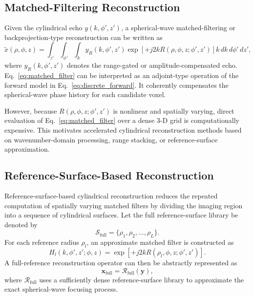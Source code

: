\documentclass[journal]{IEEEtran}
\begin{document}
\subsection{Matched-Filtering Reconstruction}
\label{subsec:matched_filter}

Given the cylindrical echo \(y(k,\phi',z')\), a spherical-wave matched-filtering or backprojection-type reconstruction can be written as
\begin{equation}
 \tilde{x}(\rho,\phi,z)=
 \int_{z'}\int_{\phi'}\int_{k}
 y_R(k,\phi',z')
 \exp[+j2kR(\rho,\phi,z;\phi',z')]
 k\, dk\, d\phi'\, dz',
\label{eq:matched_filter}
\end{equation}
where \(y_R(k,\phi',z')\) denotes the range-gated or amplitude-compensated echo. Eq.~\eqref{eq:matched_filter} can be interpreted as an adjoint-type operation of the forward model in Eq.~\eqref{eq:discrete_forward}. It coherently compensates the spherical-wave phase history for each candidate voxel.

However, because \(R(\rho,\phi,z;\phi',z')\) is nonlinear and spatially varying, direct evaluation of Eq.~\eqref{eq:matched_filter} over a dense 3-D grid is computationally expensive. This motivates accelerated cylindrical reconstruction methods based on wavenumber-domain processing, range stacking, or reference-surface approximation.

\subsection{Reference-Surface-Based Reconstruction}
\label{subsec:reference_surface}

Reference-surface-based cylindrical reconstruction reduces the repeated computation of spatially varying matched filters by dividing the imaging region into a sequence of cylindrical surfaces. Let the full reference-surface library be denoted by
\begin{equation}
\mathcal{S}_{\mathrm{full}}=
\{\rho_1,\rho_2,\ldots,\rho_L\}.
\label{eq:full_reference_library}
\end{equation}
For each reference radius \(\rho_l\), an approximate matched filter is constructed as
\begin{equation}
 H_l(k,\phi',z';\phi,z)=
 \exp[+j2kR(\rho_l,\phi,z;\phi',z')].
\label{eq:reference_filter}
\end{equation}
A full-reference reconstruction operator can then be abstractly represented as
\begin{equation}
 \mathbf{x}_{\mathrm{full}}=\mathcal{R}_{\mathrm{full}}(\mathbf{y}),
\label{eq:full_reconstruction}
\end{equation}
where \(\mathcal{R}_{\mathrm{full}}\) uses a sufficiently dense reference-surface library to approximate the exact spherical-wave focusing process.
\end{document}
